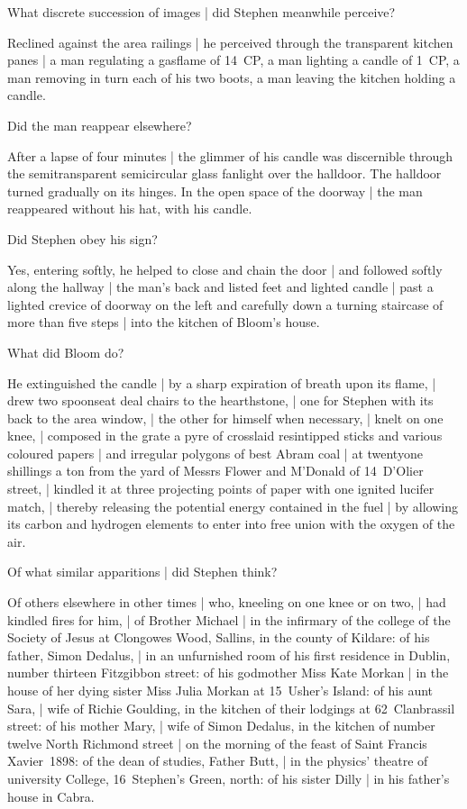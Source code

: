 
What discrete succession of images |
did Stephen meanwhile perceive?

\Science
Reclined against the area railings |
he perceived through the transparent kitchen panes |
a man regulating a gasflame of 14~CP,
a man lighting a candle of 1~CP,
a man removing in turn each of his two boots,
a man leaving the kitchen holding a candle.


Did the man reappear elsewhere?

\Factual
After a lapse of four minutes |
the glimmer of his candle was discernible
through the semitransparent semicircular glass fanlight over the halldoor.
The halldoor turned gradually on its hinges.
In the open space of the doorway |
the man reappeared without his hat, with his candle.


Did Stephen obey his sign?

\Factual
Yes,
entering softly,
he helped to close and chain the door |
and followed softly along the hallway |
the man's back and listed feet and lighted candle |
past a lighted crevice of doorway on the left
and carefully down a turning staircase of more than five steps |
into the kitchen of Bloom's house.


What did Bloom do?

\Science
He extinguished the candle |
by a sharp expiration of breath upon its flame, |
drew two spoonseat deal chairs to the hearthstone, |
one for Stephen with its back to the area window, |
the other for himself when necessary, |
knelt on one knee, |
composed in the grate a pyre of crosslaid resintipped sticks
and various coloured papers |
and irregular polygons of best Abram coal |
at twentyone shillings a ton
from the yard of Messrs Flower and M'Donald of 14~D'Olier street, |
kindled it at three projecting points of paper
with one ignited lucifer match, |
thereby releasing the potential energy
contained in the fuel |
by allowing its carbon and hydrogen elements
to enter into free union with the oxygen of the air.



Of what similar apparitions |
did Stephen think?

\Stephen
Of others elsewhere in other times |
who, kneeling on one knee or on two, |
had kindled fires for him, |
of Brother Michael |
in the infirmary of the college of the Society of Jesus
at Clongowes Wood, Sallins, in the county of Kildare:
of his father, Simon Dedalus, |
in an unfurnished room of his first residence in Dublin,
number thirteen Fitzgibbon street:
of his godmother Miss Kate Morkan |
in the house of her dying sister Miss Julia Morkan
at 15~Usher's Island:
of his aunt Sara, |
wife of Richie
Goulding,
in the kitchen of their lodgings at 62~Clanbrassil street:
of his mother Mary, |
wife of Simon Dedalus,
in the kitchen of number twelve North Richmond street |
on the morning of the feast of Saint Francis Xavier~1898:
of the dean of studies, Father Butt, |
in the physics' theatre of university College,
16~Stephen's Green, north:
of his sister Dilly
 |
in his father's house in Cabra.


